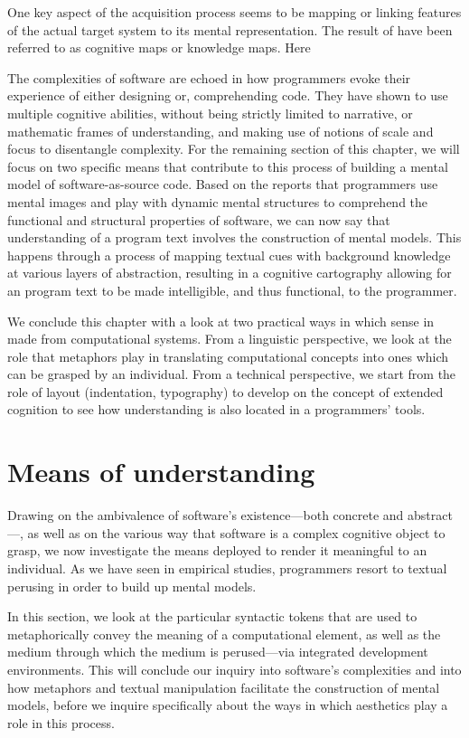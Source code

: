 One key aspect  of the acquisition process seems to be mapping or linking features of the actual target system to its mental representation. The result of  have been referred to as cognitive maps or knowledge maps. Here

The complexities of software are echoed in how programmers evoke their experience of either designing or, comprehending code. They have shown to use multiple cognitive abilities, without being strictly limited to narrative, or mathematic frames of understanding, and making use of notions of scale and focus to disentangle complexity. For the remaining section of this chapter, we will focus on two specific means that contribute to this process of building a mental model of software-as-source code. Based on the reports that programmers use mental images and play with dynamic mental structures to comprehend the functional and structural properties of software, we can now say that understanding of a program text involves the construction of mental models. This happens through a process of mapping textual cues with background knowledge at various layers of abstraction, resulting in a cognitive cartography allowing for an program text to be made intelligible, and thus functional, to the programmer. 

We conclude this chapter with a look at two practical ways in which sense in made from computational systems. From a linguistic perspective, we look at the role that metaphors play in translating computational concepts into ones which can be grasped by an individual. From a technical perspective, we start from the role of layout (indentation, typography) to develop on the concept of extended cognition to see how understanding is also located in a programmers' tools.

\section{Means of understanding}
\label{sec:means-understanding}

Drawing on the ambivalence of software's existence—both concrete and abstract—, as well as on the various way that software is a complex cognitive object to grasp, we now investigate the means deployed to render it meaningful to an individual. As we have seen in empirical studies, programmers resort to textual perusing in order to build up mental models.

In this section, we look at the particular syntactic tokens that are used to metaphorically convey the meaning of a computational element, as well as the medium through which the medium is perused—via integrated development environments. This will conclude our inquiry into software's complexities and into how metaphors and textual manipulation facilitate the construction of mental models, before we inquire specifically about the ways in which aesthetics play a role in this process.

